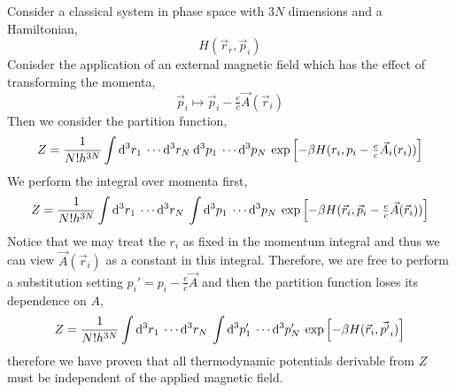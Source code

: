 \documentclass[12pt]{extarticle}
\begin{document}
Consider a classical system in phase space with $3 N$ dimensions and a Hamiltonian,
\[ H(\vec{r}_r, \vec{p}_i) \]
Conisder the application of an external magnetic field which has the effect of transforming the momenta,
\[ \vec{p}_i \mapsto \vec{p}_i - \tfrac{e}{c} \vec{A}(\vec{r}_i) \]
Then we consider the partition function,
\[ Z = \frac{1}{N! h^{3N}} \int \mathrm{d}^{3} r_1 \: \cdots \mathrm{d}^{3} r_N \: \mathrm{d}^{3} p_1 \: \cdots \mathrm{d}^{3} p_N \: \exp{\left[- \beta H(r_i, p_i - \tfrac{e}{c} \vec{A}_i(r_i)) \right]} \]
We perform the integral over momenta first,
\[ Z = \frac{1}{N! h^{3N}} \int \mathrm{d}^{3} r_1 \: \cdots \mathrm{d}^{3} r_N \: \int \mathrm{d}^{3} p_1 \: \cdots \mathrm{d}^{3} p_N \: \exp{\left[- \beta H(\vec{r}_i, \vec{p}_i - \tfrac{e}{c} \vec{A}(\vec{r}_i)) \right]} \]
Notice that we may treat the $r_i$ as fixed in the momentum integral and thus we can view $\vec{A}(\vec{r}_i)$ as a constant in this integral. Therefore, we are free to perform a substitution setting $p_i' = p_i - \tfrac{e}{c} \vec{A}$ and then the partition function loses its dependence on $A$, 
\[ Z = \frac{1}{N! h^{3N}} \int \mathrm{d}^{3} r_1 \: \cdots \mathrm{d}^{3} r_N \: \int \mathrm{d}^{3} p'_1 \: \cdots \mathrm{d}^{3} p'_N \: \exp{\left[- \beta H(\vec{r}_i, \vec{p'}_i) \right]} \]
therefore we have proven that all thermodynamic potentials derivable from $Z$ must be independent of the applied magnetic field. 
\end{document}
